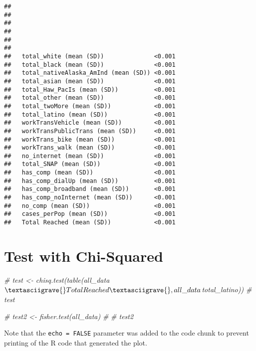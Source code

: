 \documentclass[
]{article}
\newenvironment{Shaded}{\begin{snugshade}}{\end{snugshade}}
\newcommand{\CommentTok}[1]{\textcolor[rgb]{0.56,0.35,0.01}{\textit{#1}}}
\begin{document}
\begin{verbatim}
##                                                   
##                                                   
##                                                   
##                                                   
##                                                   
##                                                   
##   total_white (mean (SD))              <0.001     
##   total_black (mean (SD))              <0.001     
##   total_nativeAlaska_AmInd (mean (SD)) <0.001     
##   total_asian (mean (SD))              <0.001     
##   total_Haw_PacIs (mean (SD))          <0.001     
##   total_other (mean (SD))              <0.001     
##   total_twoMore (mean (SD))            <0.001     
##   total_latino (mean (SD))             <0.001     
##   workTransVehicle (mean (SD))         <0.001     
##   workTransPublicTrans (mean (SD))     <0.001     
##   workTrans_bike (mean (SD))           <0.001     
##   workTrans_walk (mean (SD))           <0.001     
##   no_internet (mean (SD))              <0.001     
##   total_SNAP (mean (SD))               <0.001     
##   has_comp (mean (SD))                 <0.001     
##   has_comp_dialUp (mean (SD))          <0.001     
##   has_comp_broadband (mean (SD))       <0.001     
##   has_comp_noInternet (mean (SD))      <0.001     
##   no_comp (mean (SD))                  <0.001     
##   cases_perPop (mean (SD))             <0.001     
##   Total Reached (mean (SD))            <0.001
\end{verbatim}

\hypertarget{test-with-chi-squared}{%
\section{Test with Chi-Squared}\label{test-with-chi-squared}}

\begin{Shaded}
\begin{Highlighting}[]
\CommentTok{\# test \textless{}{-} chisq.test(table(all\_data$\textasciigrave{}Total Reached\textasciigrave{}, all\_data$total\_latino))}
\CommentTok{\# test}


\CommentTok{\# test2 \textless{}{-} fisher.test(all\_data)}
\CommentTok{\# }
\CommentTok{\# test2}
\end{Highlighting}
\end{Shaded}

Note that the \texttt{echo\ =\ FALSE} parameter was added to the code
chunk to prevent printing of the R code that generated the plot.
\end{document}
